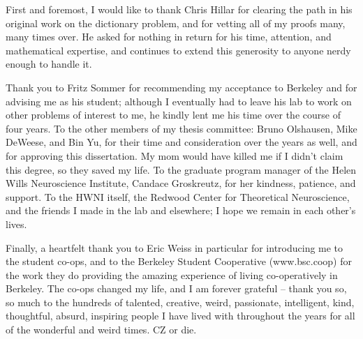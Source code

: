 \documentclass{ucbthesis}
\begin{document}
\begin{frontmatter}
\tableofcontents
\clearpage
\listoffigures
\clearpage

\begin{acknowledgements}
First and foremost, I would like to thank Chris Hillar for clearing the path in his original work on the dictionary problem, and for vetting all of my proofs many, many times over. He asked for nothing in return for his time, attention, and mathematical expertise, and continues to extend this generosity to anyone nerdy enough to handle it. 

Thank you to Fritz Sommer for recommending my acceptance to Berkeley and for advising me as his student; although I eventually had to leave his lab to work on other problems of interest to me, he kindly lent me his time over the course of four years. 
To the other members of my thesis committee: Bruno Olshausen, Mike DeWeese, and Bin Yu, for their time and consideration over the years as well, and for approving this dissertation. My mom would have killed me if I didn't claim this degree, so they saved my life. 
To the graduate program manager of the Helen Wills Neuroscience Institute, Candace Groskreutz, for her kindness, patience, and support. 
To the HWNI itself, the Redwood Center for Theoretical Neuroscience, and the friends I made in the lab and elsewhere; I hope we remain in each other's lives. 

Finally, a heartfelt thank you to Eric Weiss in particular for introducing me to the student co-ops, and to the Berkeley Student Cooperative (www.bsc.coop) for the work they do providing the amazing experience of living co-operatively in Berkeley. The co-ops changed my life, and I am forever grateful -- thank you so, so much to the hundreds of talented, creative, weird, passionate, intelligent, kind, thoughtful, absurd, inspiring people I have lived with throughout the years for all of the wonderful and weird times. CZ or die. 
\end{acknowledgements}

\end{frontmatter}

\pagestyle{headings}


 
 





% 

\printbibliography
\end{document}
